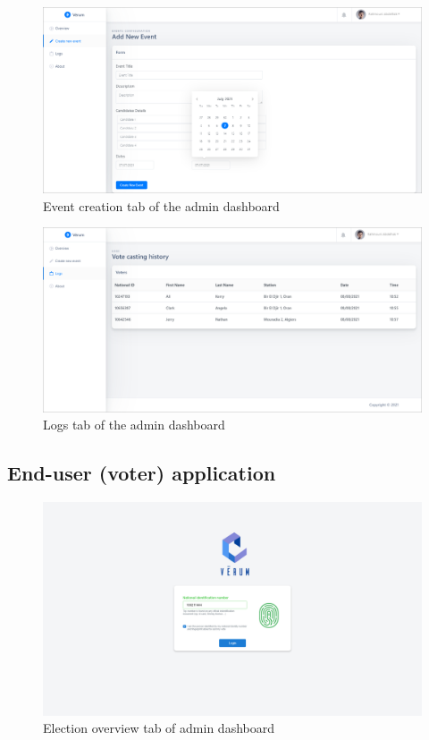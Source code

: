 \begin{figure}[H]
	\centering
		\includegraphics[width=14cm]{images/chapter3/admin_2.png}
		\caption{{\footnotesize Event creation tab of the admin dashboard}}
\end{figure}

\begin{figure}[H]
	\centering
		\includegraphics[width=14cm]{images/chapter3/admin_3.png}
		\caption{{\footnotesize Logs tab of the admin dashboard}}
\end{figure}

\subsection{End-user (voter) application}

\begin{figure}[H]
	\centering
		\includegraphics[width=14cm]{images/chapter3/voter_2.png}
		\caption{{\footnotesize Election overview tab of admin dashboard}}
\end{figure}


